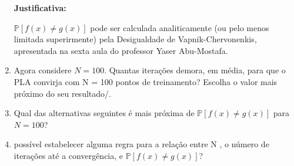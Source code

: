 \begin{enumerate}
    \par

    \textbf{Justificativa:}
     
    $\mathbb{P}[f(x) \neq g(x)]$ pode ser calculada analiticamente (ou pelo menos limitada superirmente) pela Desigualdade de Vapnik-Chervonenkis, apresentada na sexta aula do professor Yaser Abu-Mostafa.

    

    \item Agora considere $N = 100$. Quantas iterações demora, em média, para que o PLA convirja com
    N = 100 pontos de treinamento? Escolha o valor mais próximo do seu resultado/.

    \item Qual das alternativas seguintes é mais próxima de $\mathbb{P}[f(x) \neq g(x)]$ para $N = 100$?
    
    \item  possível estabelecer alguma regra para a relação entre N , o número de iterações até a convergência,
    e $\mathbb{P}[f(x) \neq g(x)]$?
\end{enumerate}